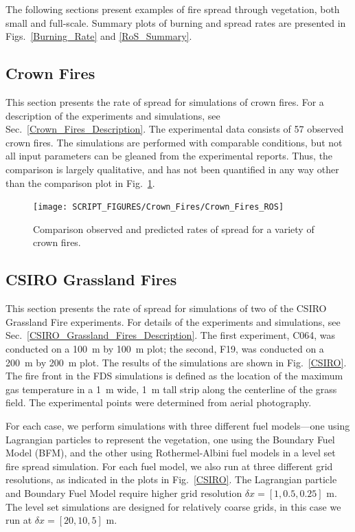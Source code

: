 The following sections present examples of fire spread through vegetation, both small and full-scale. Summary plots of burning and spread rates are presented in Figs.~\ref{Burning_Rate} and \ref{RoS_Summary}.


\subsection{Crown Fires}

This section presents the rate of spread for simulations of crown fires. For a description of the experiments and simulations, see Sec.~\ref{Crown_Fires_Description}. The experimental data consists of 57 observed crown fires. The simulations are performed with comparable conditions, but not all input parameters can be gleaned from the experimental reports. Thus, the comparison is largely qualitative, and has not been quantified in any way other than the comparison plot in Fig.~\ref{Crown_Fire_Plot}.

\begin{figure}[ht]
\centering
\texttt{[image: SCRIPT\_FIGURES/Crown\_Fires/Crown\_Fires\_ROS]}
\caption[Comparison observed and predicted rates of spread for a variety of crown fires]{Comparison observed and predicted rates of spread for a variety of crown fires.}
\label{Crown_Fire_Plot}
\end{figure}


\clearpage


\subsection{CSIRO Grassland Fires}

This section presents the rate of spread for simulations of two of the CSIRO Grassland Fire experiments. For details of the experiments and simulations, see Sec.~\ref{CSIRO_Grassland_Fires_Description}. The first experiment, C064, was conducted on a 100~m by 100~m plot; the second, F19, was conducted on a 200~m by 200~m plot. The results of the simulations are shown in Fig.~\ref{CSIRO}. The fire front in the FDS simulations is defined as the location of the maximum gas temperature in a 1~m wide, 1~m tall strip along the centerline of the grass field. The experimental points were determined from aerial photography.

For each case, we perform simulations with three different fuel models---one using Lagrangian particles to represent the vegetation, one using the Boundary Fuel Model (BFM), and the other using Rothermel-Albini fuel models in a level set fire spread simulation.  For each fuel model, we also run at three different grid resolutions, as indicated in the plots in Fig.~\ref{CSIRO}.  The Lagrangian particle and Boundary Fuel Model require higher grid resolution $\delta x = [1, 0.5, 0.25]$ m.  The level set simulations are designed for relatively coarse grids, in this case we run at $\delta x = [20, 10, 5]$ m.


